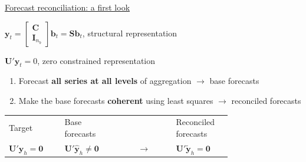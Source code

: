 \documentclass[aspectratio=169, table,colorlinks]{beamer}
\newcommand{\relationD}[3]
{
	\draw (#3.east) -- +(#1,0) |- (#2.west)
}
\newcommand{\bvet}{\bm{b}}
\newcommand{\yvet}{\bm{y}}
\newcommand{\Cvet}{\bm{C}}
\newcommand{\Ivet}{\bm{I}}
\newcommand{\Svet}{\bm{S}}
\newcommand{\Uvet}{\bm{U}}
\newcommand{\Zerovet}{\bm{0}}
\begin{document}
\begin{frame}[label = {cap:aflook}]{\hyperlink{app:aflook}{\color{white}Forecast reconciliation: a first look}}
\begin{minipage}{0.49\linewidth}
{}
\end{minipage}
\hspace{-5cm}
\vskip0.1cm
\begin{minipage}{0.5\linewidth}
	\centering
	$\yvet_t = \begin{bmatrix}
		\Cvet \\ \Ivet_{n_b}
	\end{bmatrix}\bvet_t = \Svet \bvet_t$, {\color{newblue}structural representation}
\end{minipage}\hspace{0.2cm}
\begin{minipage}{0.45\linewidth}
	\centering
		$\Uvet' \yvet_t = 0$, {\color{newblue}zero constrained representation}
\end{minipage}
\vskip0.5cm
\begin{enumerate}
	\item Forecast \textbf{all series at all levels} of aggregation $\rightarrow$ {\color{newred}base forecasts}
	\item Make the base forecasts \textbf{coherent} using least squares $\rightarrow$ {\color{newblue}reconciled forecasts}
\end{enumerate}
\begin{center}
\begin{tabular}{M{0.25\linewidth}M{0.25\linewidth}cM{0.25\linewidth}}
	Target & {\color{newred}Base forecasts} & & Reconciled forecasts \\
	${\Uvet}'\yvet_h = \Zerovet$ & {\color{newred}${\Uvet}'\widehat{\yvet}_h\neq \Zerovet$} & $\rightarrow$ & ${\Uvet}'\widetilde{\yvet}_h = \Zerovet$
\end{tabular}
\vspace{-0.75cm}
\end{center}
\end{frame}
\end{document}
